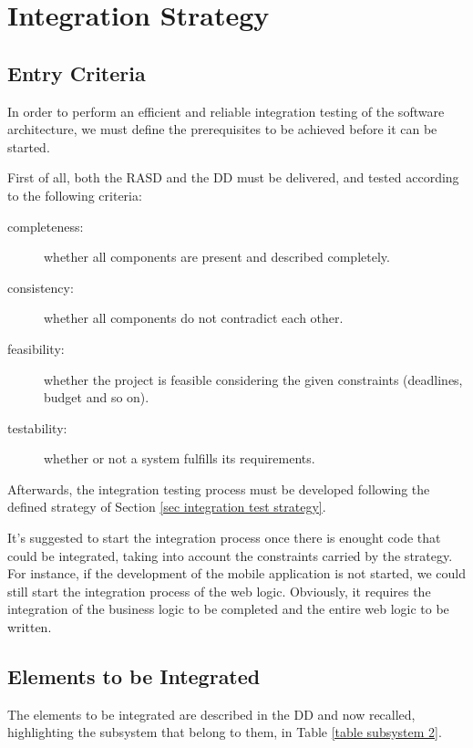 \section{Integration Strategy} \label{sec integration strategy}


\subsection{Entry Criteria}

In order to perform an efficient and reliable integration testing of the software architecture, we must define the prerequisites to be achieved before it can be started.

First of all, both the RASD and the DD must be delivered, and tested according to the following criteria: 

\begin{description}
	\item[completeness:] whether all components are present and described completely.
	\item[consistency:] whether all components do not contradict each other.
	\item[feasibility:] whether the project is feasible considering the given constraints (deadlines, budget and so on).
	\item[testability:] whether or not a system fulfills its requirements.
\end{description}

Afterwards, the integration testing process must be developed following the defined strategy of Section \ref{sec integration test strategy}. 

It's suggested to start the integration process once there is enought code that could be integrated, taking into account the constraints carried by the strategy. For instance, if the development of the mobile application is not started, we could still start the integration process of the web logic. Obviously, it requires the integration of the business logic to be completed and the entire web logic to be written.

\subsection{Elements to be Integrated}

The elements to be integrated are described in the DD and now recalled, highlighting the subsystem that belong to them, in Table \ref{table subsystem 2}.

